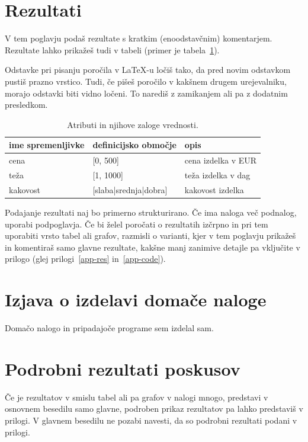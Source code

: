\documentclass[a4paper,11pt]{article}
\begin{document}
\section{Rezultati}

V tem poglavju podaš rezultate s kratkim (enoodstavčnim)
komentarjem. Rezultate lahko prikažeš tudi v tabeli (primer je
tabela~\ref{tab1}).

Odstavke pri pisanju poročila v LaTeX-u ločiš tako, da pred novim
odstavkom pustiš prazno vrstico. Tudi, če pišeš poročilo v kakšnem
drugem urejevalniku, morajo odstavki biti vidno ločeni. To narediš z
zamikanjem ali pa z dodatnim presledkom.

\begin{table}[htbp]
\caption{Atributi in njihove zaloge vrednosti.}
\label{tab1}
\begin{center}
\begin{tabular}{llp{3cm}}
\hline
ime spremenljivke & definicijsko območje & opis \\
\hline
cena & [0, 500] & cena izdelka v EUR\\
teža & [1, 1000] & teža izdelka v dag \\
kakovost & [slaba|srednja|dobra] & kakovost izdelka \\
\hline
\end{tabular}
\end{center}
\end{table}

Podajanje rezultati naj bo primerno strukturirano. Če ima naloga več
podnalog, uporabi podpoglavja. Če bi želel poročati o rezultatih
izčrpno in pri tem uporabiti vrsto tabel ali grafov, razmisli o
varianti, kjer v tem poglavju prikažeš in komentiraš samo glavne
rezultate, kakšne manj zanimive detajle pa vključite v prilogo (glej
prilogi~\ref{app-res} in~\ref{app-code}).

\section{Izjava o izdelavi domače naloge}
Domačo nalogo in pripadajoče programe sem izdelal sam.

\appendix
\appendixpage
\section{\label{app-res}Podrobni rezultati poskusov}

Če je rezultatov v smislu tabel ali pa grafov v nalogi mnogo,
predstavi v osnovnem besedilu samo glavne, podroben prikaz
rezultatov pa lahko predstaviš v prilogi. V glavnem besedilu ne
pozabi navesti, da so podrobni rezultati podani v prilogi.
\end{document}
